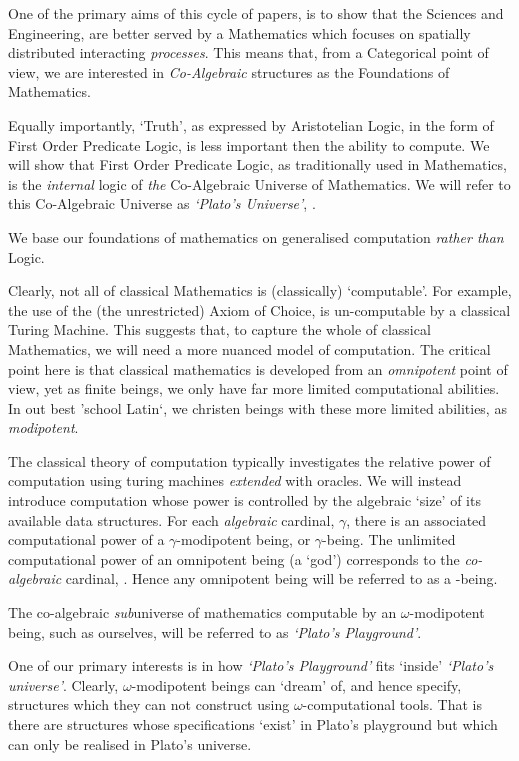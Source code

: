 \documentclass[a4paper,openany]{amsbook}
\begin{document}
One of the primary aims of this cycle of papers, is to show that the Sciences
and Engineering, are better served by a Mathematics which focuses on spatially
distributed interacting \emph{processes}. This means that, from a Categorical
point of view, we are interested in \emph{Co-Algebraic} structures as the
Foundations of Mathematics.

Equally importantly, `Truth', as expressed by Aristotelian Logic, in the form of
First Order Predicate Logic, is less important then the ability to compute. We
will show that First Order Predicate Logic, as traditionally used in
Mathematics, is the \emph{internal} logic of \emph{the} Co-Algebraic Universe of
Mathematics. We will refer to this Co-Algebraic Universe as \emph{`Plato's
Universe'}, \Universe.

We base our foundations of mathematics on generalised computation \emph{rather
than} Logic.

Clearly, not all of classical Mathematics is (classically) `computable'. For
example, the use of the (the unrestricted) Axiom of Choice, is un-computable by
a classical Turing Machine. This suggests that, to capture the whole of
classical Mathematics, we will need a more nuanced model of computation. The
critical point here is that classical mathematics is developed from an
\emph{omnipotent} point of view, yet as finite beings, we only have far more
limited computational abilities. In out best 'school Latin`, we christen beings
with these more limited abilities, as \emph{modipotent}.

The classical theory of computation typically investigates the relative power of
computation using turing machines \emph{extended} with oracles. We will instead
introduce computation whose power is controlled by the algebraic `size' of its
available data structures. For each \emph{algebraic} cardinal, $\gamma$, there
is an associated computational power of a $\gamma$-modipotent being, or
$\gamma$-being. The unlimited computational power of an omnipotent being (a
`god') corresponds to the \emph{co-algebraic} cardinal, \Cardinal. Hence any
omnipotent being will be referred to as a \Cardinal-being.

The co-algebraic \emph{sub}universe of mathematics computable by an
$\omega$-modipotent being, such as ourselves, will be referred to as
\emph{`Plato's Playground'}.

One of our primary interests is in how \emph{`Plato's Playground'} fits `inside'
\emph{`Plato's universe'}. Clearly, $\omega$-modipotent beings can `dream' of,
and hence specify, structures which they can not construct using
$\omega$-computational tools. That is there are structures whose specifications
`exist' in Plato's playground but which can only be realised in Plato's
universe.
\end{document}
